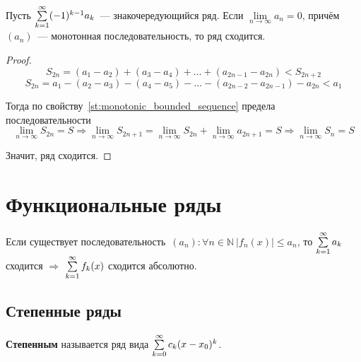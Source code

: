 \begin{theorem}
Пусть $\series (-1)^{k-1} a_k$~--- знакочередующийся ряд.
Если $\lim\limits_{n \to \infty} a_n = 0$, причём $(a_n)$~--- монотонная последовательность, то ряд сходится.
\end{theorem}
\begin{proof}
\begin{equation*}
S_{2n} = (a_1 - a_2) + (a_3 - a_4) + \ldots + (a_{2n-1} - a_{2n}) < S_{2n+2}
\end{equation*}
\begin{equation*}
S_{2n} = a_1 - (a_2 - a_3) - (a_4 - a_5) - \ldots - (a_{2n-2} - a_{2n-1}) - a_{2n} < a_1
\end{equation*}

Тогда по свойству~\ref{st:monotonic_bounded_sequence} предела последовательности
\begin{equation*}
\lim_{n \to \infty} S_{2n} = S \Rightarrow
\lim_{n \to \infty} S_{2n+1} =
\lim_{n \to \infty} S_{2n} + \lim_{n \to \infty} a_{2n+1} =
S \Rightarrow
\lim_{n \to \infty} S_n = S
\end{equation*}

Значит, ряд сходится.
\end{proof}

\section{Функциональные ряды}

\begin{theorem}
Если существует последовательность~$(a_n) \colon \forall n \in \mathbb N \ |f_n(x)| \leqslant a_n$, то $\series a_k$ сходится $\Rightarrow$ $\series f_k(x)$ сходится абсолютно.
\end{theorem}

\subsection{Степенные ряды}
 \textbf{Степенным} называется ряд вида $\series[0] c_k (x - x_0)^k$.

